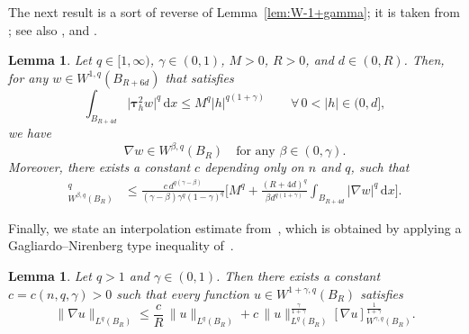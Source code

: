 \documentclass[10pt,letterpaper]{amsart}
\newtheorem{lemma}[theorem]{Lemma}
\theoremstyle{definition}
\numberwithin{theorem}{section}
\numberwithin{equation}{section}
\newcommand{\1}{\ensuremath{\mathds{1}}}
\newcommand{\dx}{\mathrm{d}x}
\numberwithin{equation}{section}
\begin{document}

The next result is a sort of reverse of Lemma~\ref{lem:W-1+gamma}; it is taken from 
\cite[Lemma 2.9]{DKLN-pot}; see also \cite[Proposition 2.4]{Brasco-Lindgren}, and \cite[Lemma 2.6]{Brasco-Lindgren-Schikorra}.

\begin{lemma}\label{lem:2nd-Ni-FS}
Let $q\in [1,\infty)$, $\gamma \in (0,1)$, $M>0$, $R>0$, and $d \in (0,R)$. Then, for any 
 $w\in W^{1,q}(B_{R+6d })$ that satisfies
\begin{equation*}%
    \int_{B_{R+4d }}\big|\boldsymbol{\tau}^2_h w\big|^q\,\dx
    \le
    M^q|h|^{q (1+\gamma )}\qquad \forall\, 0<|h|\in (0,d ],
\end{equation*}
we have 
$$
\nabla w\in W^{\beta,q}(B_R)\quad \mbox{for any $\beta\in (0,\gamma )$.}
$$
Moreover, there  exists a constant $c$ depending only on $n$ and $q$,
such that 
\begin{align*}
     [\nabla w]_{W^{\beta,q}(B_R)}^q
    &\le
    \frac{c\, d ^{q(\gamma -\beta)}}{(\gamma -\beta) \gamma ^q (1-\gamma )^q}
    \bigg[ M^q + \frac{(R+4d )^{q}}{\beta d ^{q(1+\gamma )}} 
    \int_{B_{R+4d }}|\nabla w|^q\,\dx
    \bigg].
\end{align*}
\end{lemma}


Finally, we state an interpolation estimate from~\cite[Corollary 2.6]{BDLM}, which is obtained by applying a Gagliardo--Nirenberg type inequality of~\cite[Theorem~1]{BM}.

\begin{lemma}\label{lem:GN}
Let $q>1$ and $\gamma\in(0,1)$. 
Then there exists a constant $c=c(n,q,\gamma)>0$ such that every function $u\in W^{1+\gamma,q}(B_R)$ satisfies
\begin{equation*}
    \|\nabla u\|_{L^q(B_R)}
    \le 
    \frac{c}{R}\,\|u\|_{L^q(B_R)}
    + 
    c\, 
    \|u\|_{L^q(B_R)}^{\frac{\gamma}{1+\gamma}}
    [\nabla u]_{W^{\gamma,q}(B_R)}^{\frac{1}{1+\gamma}}.
\end{equation*}
\end{lemma}
\end{document}
